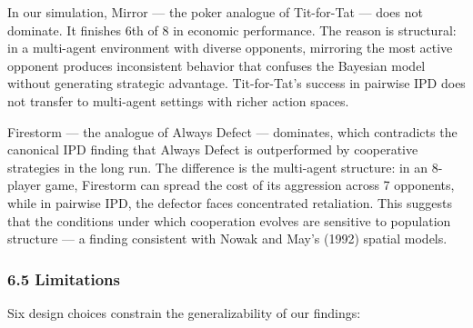 \documentclass[
]{article}
\begin{document}
In our simulation, Mirror --- the poker analogue of Tit-for-Tat --- does
not dominate. It finishes 6th of 8 in economic performance. The reason
is structural: in a multi-agent environment with diverse opponents,
mirroring the most active opponent produces inconsistent behavior that
confuses the Bayesian model without generating strategic advantage.
Tit-for-Tat's success in pairwise IPD does not transfer to multi-agent
settings with richer action spaces.

Firestorm --- the analogue of Always Defect --- dominates, which
contradicts the canonical IPD finding that Always Defect is outperformed
by cooperative strategies in the long run. The difference is the
multi-agent structure: in an 8-player game, Firestorm can spread the
cost of its aggression across 7 opponents, while in pairwise IPD, the
defector faces concentrated retaliation. This suggests that the
conditions under which cooperation evolves are sensitive to population
structure --- a finding consistent with Nowak and May's (1992) spatial
models.

\hypertarget{limitations}{%
\subsubsection{6.5 Limitations}\label{limitations}}

Six design choices constrain the generalizability of our findings:
\end{document}
